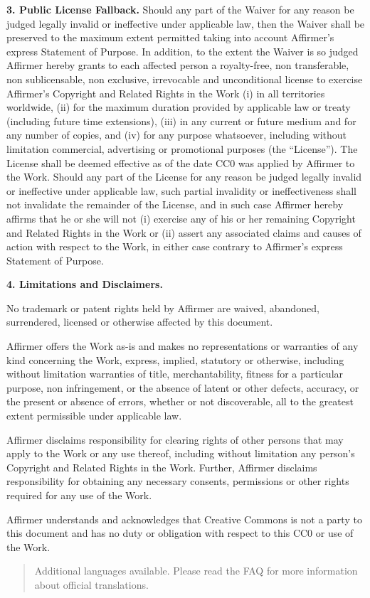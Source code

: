 \par \textbf{3. Public License Fallback.} Should any
part of the Waiver for any reason be judged legally invalid or
ineffective under applicable law, then the Waiver shall be
preserved to the maximum extent permitted taking into account
Affirmer's express Statement of Purpose. In addition, to the
extent the Waiver is so judged Affirmer hereby grants to each
affected person a royalty-free, non transferable, non
sublicensable, non exclusive, irrevocable and unconditional
license to exercise Affirmer's Copyright and Related Rights
in the Work (i) in all territories worldwide, (ii) for the
maximum duration provided by applicable law or treaty
(including future time extensions), (iii) in any current or
future medium and for any number of copies, and (iv) for any
purpose whatsoever, including without limitation commercial,
advertising or promotional purposes (the ``License''). The
License shall be deemed effective as of the date CC0 was
applied by Affirmer to the Work. Should any part of the
License for any reason be judged legally invalid or
ineffective under applicable law, such partial invalidity or
ineffectiveness shall not invalidate the remainder of the
License, and in such case Affirmer hereby affirms that he or
she will not (i) exercise any of his or her remaining
Copyright and Related Rights in the Work or (ii) assert any
associated claims and causes of action with respect to the
Work, in either case contrary to Affirmer's express Statement
of Purpose.
\par \textbf{4. Limitations and Disclaimers.}
\begin{doclicense@enumerate}
\item No trademark or patent rights held by Affirmer are
waived, abandoned, surrendered, licensed or otherwise
affected by this document.
\item Affirmer offers the Work as-is and makes no
representations or warranties of any kind concerning the
Work, express, implied, statutory or otherwise, including
without limitation warranties of title, merchantability,
fitness for a particular purpose, non infringement, or the
absence of latent or other defects, accuracy, or the present
or absence of errors, whether or not discoverable, all to
the greatest extent permissible under applicable law.
\item Affirmer disclaims responsibility for clearing rights of
other persons that may apply to the Work or any use thereof,
including without limitation any person's Copyright and
Related Rights in the Work. Further, Affirmer disclaims
responsibility for obtaining any necessary consents,
permissions or other rights required for any use of the
Work.
\item Affirmer understands and acknowledges that Creative
Commons is not a party to this document and has no duty or
obligation with respect to this CC0 or use of the Work.
\end{doclicense@enumerate}

\begin{quotation}Additional languages available. Please read the FAQ for more information about official translations.\end{quotation}



